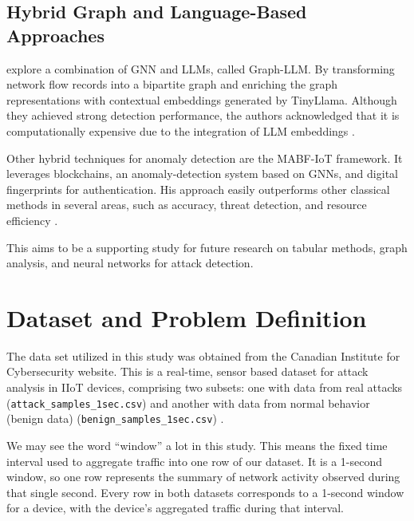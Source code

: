 \documentclass[final,5p,times,twocolumn]{elsarticle}
\begin{document}
\subsection{Hybrid Graph and Language-Based Approaches}
\cite{hwang2026cgllm} explore a combination of GNN and LLMs, called Graph-LLM. By transforming network flow records into a bipartite graph and enriching the graph representations with contextual embeddings generated by TinyLlama. Although they achieved strong detection performance, the authors acknowledged that it is computationally expensive due to the integration of LLM embeddings \citep{hwang2026cgllm}.

Other hybrid techniques for anomaly detection are the MABF-IoT framework. It leverages blockchains, an anomaly-detection system based on GNNs, and digital fingerprints for authentication. His approach easily outperforms other classical methods in several areas, such as accuracy, threat detection, and resource efficiency \citep{jhariya_secure_2026}.

This aims to be a supporting study for future research on tabular methods, graph analysis, and neural networks for attack detection.


\section{Dataset and Problem Definition}
\label{sec:dataset_problem_definition}

The data set utilized in this study was obtained from the Canadian Institute for Cybersecurity website. This is a real-time, sensor based dataset for attack analysis in IIoT devices, comprising two subsets: one with data from real attacks (\texttt{attack\_samples\_1sec.csv}) and another with data from normal behavior (benign data) (\texttt{benign\_samples\_1sec.csv}) \citep{unb_iiot_2025}. 

We may see the word ``window'' a lot in this study. This means the fixed time interval used to aggregate traffic into one row of our dataset. It is a 1-second window, so one row represents the summary of network activity observed during that single second. Every row in both datasets corresponds to a 1-second window for a device, with the device's aggregated traffic during that interval.
\end{document}
